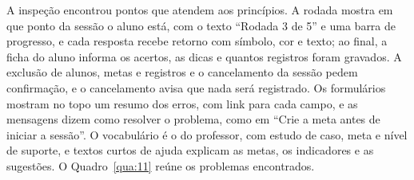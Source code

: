 A inspeção encontrou pontos que atendem aos princípios. A rodada mostra em que ponto da sessão o aluno está, com o texto “Rodada 3 de 5” e uma barra de progresso, e cada resposta recebe retorno com símbolo, cor e texto; ao final, a ficha do aluno informa os acertos, as dicas e quantos registros foram gravados. A exclusão de alunos, metas e registros e o cancelamento da sessão pedem confirmação, e o cancelamento avisa que nada será registrado. Os formulários mostram no topo um resumo dos erros, com link para cada campo, e as mensagens dizem como resolver o problema, como em “Crie a meta antes de iniciar a sessão”. O vocabulário é o do professor, com estudo de caso, meta e nível de suporte, e textos curtos de ajuda explicam as metas, os indicadores e as sugestões. O Quadro~\ref{qua:11} reúne os problemas encontrados.

